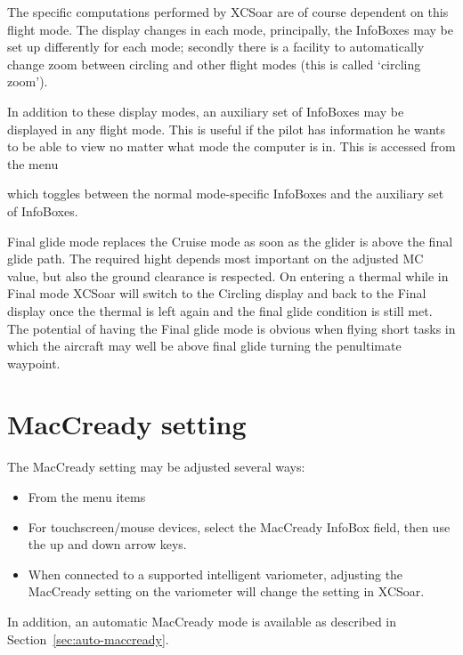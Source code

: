 The specific computations performed by XCSoar are of course dependent
on this flight mode.  The display changes in each mode, principally,
the InfoBoxes may be set up differently for each mode; secondly there
is a facility to automatically change zoom between circling and other
flight modes (this is called `circling zoom').

In addition to these display modes, an auxiliary set of InfoBoxes may
be displayed in any flight mode.  This is useful if the pilot has
information he wants to be able to view no matter what mode the
computer is in.  This is accessed from the menu
\begin{quote}
\blink{}\blink{}
\end{quote}

which toggles between the normal mode-specific InfoBoxes and
the auxiliary set of InfoBoxes.

Final glide mode replaces the Cruise mode as soon as the glider is above the
final glide path. The required hight depends most important on the adjusted MC
value, but also the ground clearance is respected. On entering a thermal while
in Final mode XCSoar will switch to the Circling display and back to the Final
display once the thermal is left again and the final glide condition is still
met. The potential of having the Final glide mode is obvious when
flying short tasks in which the aircraft may well be above final glide turning the penultimate
waypoint.

\section{MacCready setting}

The MacCready setting may be adjusted several ways:
\begin{itemize}
\item From the menu items
\begin{quote}
\blink{} 

\blink{}
\end{quote}
\item For touchscreen/mouse devices, select the MacCready InfoBox field, then
  use the up and down arrow keys.
\item When connected to a supported intelligent variometer, adjusting
  the MacCready setting on the variometer will change the setting
  in XCSoar.
\end{itemize}
In addition, an automatic MacCready mode is available as described in
Section~\ref{sec:auto-maccready}.

